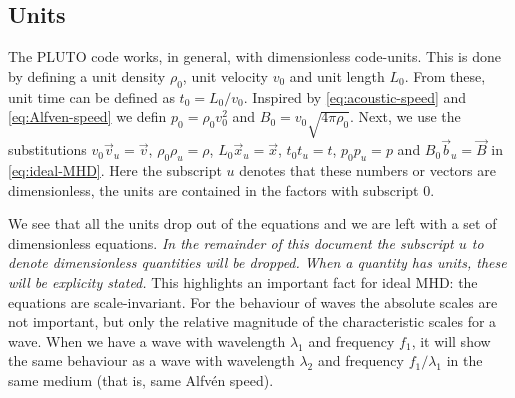\subsection{Units}
\label{sec:units}
The PLUTO code works, in general, with dimensionless code-units. This is done by defining a unit density $\rho_0$, unit velocity $v_0$ and unit length $L_0$.
From these, unit time can be defined as $t_0=L_0/v_0$. Inspired by \cref{eq:acoustic-speed} and \cref{eq:Alfven-speed} we defin $p_0=\rho_0v_0^2$ and $B_0=v_0\sqrt{4\pi\rho_0}$.
Next, we use the substitutions $v_0\vec{v}_u=\vec{v}$, $\rho_0\rho_u=\rho$, $L_0\vec{x}_u=\vec{x}$, $t_0t_u=t$, $p_0p_u=p$ and $B_0\vec{b}_u=\vec{B}$ in \cref{eq:ideal-MHD}.
Here the subscript $u$ denotes that these numbers or vectors are dimensionless, the units are contained in the factors with subscript $0$.

{\centering 
\noindent {}
\par}

We see that all the units drop out of the equations and we are left with a set of dimensionless equations.
\emph{In the remainder of this document the subscript $u$ to denote dimensionless quantities will be dropped. When a quantity has units, these will be explicity stated.}
This highlights an important fact for ideal MHD: the equations are scale-invariant.
For the behaviour of waves the absolute scales are not important, but only the relative magnitude of the characteristic scales for a wave.
When we have a wave with wavelength $\lambda_1$ and frequency $f_1$, it will show the same behaviour as a wave with wavelength $\lambda_2$ and frequency $f_1/\lambda_1$ in the same medium (that is, same Alfvén speed).

